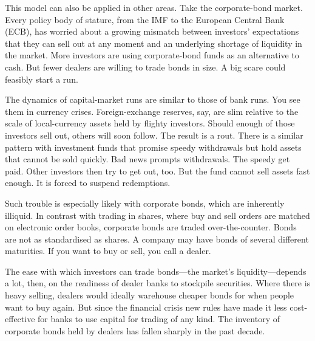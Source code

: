 This model can also be applied in other areas. Take the corporate-bond market. Every policy body of stature, from the IMF to the European Central Bank (ECB), has worried about a growing mismatch between investors' expectations that they can sell out at any moment and an underlying shortage of liquidity in the market. More investors are using corporate-bond funds as an alternative to cash. But fewer dealers are willing to trade bonds in size. A big scare could feasibly start a run.

The dynamics of capital-market runs are similar to those of bank runs. You see them in currency crises. Foreign-exchange reserves, say, are slim relative to the scale of local-currency assets held by flighty investors. Should enough of those investors sell out, others will soon follow. The result is a rout. There is a similar pattern with investment funds that promise speedy withdrawals but hold assets that cannot be sold quickly. Bad news prompts withdrawals. The speedy get paid. Other investors then try to get out, too. But the fund cannot sell assets fast enough. It is forced to suspend redemptions.

Such trouble is especially likely with corporate bonds, which are inherently illiquid. In contrast with trading in shares, where buy and sell orders are matched on electronic order books, corporate bonds are traded over-the-counter. Bonds are not as standardised as shares. A company may have bonds of several different maturities. If you want to buy or sell, you call a dealer.

The ease with which investors can trade bonds—the market’s liquidity—depends a lot, then, on the readiness of dealer banks to stockpile securities. Where there is heavy selling, dealers would ideally warehouse cheaper bonds for when people want to buy again. But since the financial crisis new rules have made it less cost-effective for banks to use capital for trading of any kind. The inventory of corporate bonds held by dealers has fallen sharply in the past decade. 

